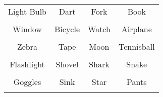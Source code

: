 \documentclass[12pt,a4paper]{article}
\begin{document}
\thispagestyle{empty}
\begin{table}[]
\centering
\Huge
\begin{tabular}{cccc}
 Light Bulb& Dart& Fork& Book\\  & & & \\
 Window& Bicycle& Watch& Airplane\\  & & & \\
 Zebra& Tape& Moon& Tennisball\\  & & & \\
 Flashlight& Shovel& Shark& Snake\\  & & & \\
 Goggles& Sink& Star& Pants\\  & & & \\
\end{tabular}
\end{table}
\end{document}
